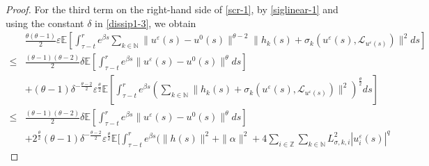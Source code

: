 \documentclass[11pt]{article}
\numberwithin{equation}{section}
\theoremstyle{plain}
\begin{document}
\begin{proof}
 For the third term on the right-hand side of \eqref{scr-1},  
 by \eqref{siglinear-1} and using the constant $\delta$ in \eqref{dissip1-3}, we obtain 
 \begin{align} \label{scr-4}      
       & \frac{\theta(\theta - 1)}{2} \varepsilon \mathbb{E}
                  \left[ \int_{\tau-t}^{r} e^{\beta s}
                              \sum_{k \in \mathbb{N} }
                                     \| u^{\varepsilon}(s) - u^0(s) \|^{\theta - 2}
                                     \| h_k(s) 
                                        + \sigma_k(u^{\varepsilon}(s), \mathcal{L}_{u^{\varepsilon}(s)}) \|^2 ds
                  \right]  \nonumber\\
 \le & \frac{(\theta - 1)(\theta - 2)}{2} \delta \mathbb{E}
                   \left[ \int_{\tau-t}^{r} e^{\beta s}
                                \| u^{\varepsilon}(s) - u^0(s) \|^\theta
                            ds
                   \right]  \nonumber\\   
      & + (\theta - 1) \delta^{-\frac{\theta - 2}{2} } \varepsilon^{\frac{\theta}{2} } 
                \mathbb{E}
                      \left[ \int_{\tau-t}^{r} e^{\beta s}
                                   \left( \sum_{k \in \mathbb{N} }
                                                         \| h_k(s) 
                                                             + \sigma_k(u^{\varepsilon}(s),   \mathcal{L}_{u^{\varepsilon}(s)}) 
                                                         \|^2 
                                         \right)^{\frac{\theta}{2} } ds
                      \right]  \nonumber\\  
 \le & \frac{(\theta - 1)(\theta - 2)}{2} \delta
               \mathbb{E}
                      \left[ \int_{\tau-t}^{r} e^{\beta s}
                                   \| u^{\varepsilon}(s) - u^0(s) \|^\theta
                               ds
                      \right]  \nonumber\\   
      & + 2^{\frac{\theta}{2} } (\theta - 1) \delta^{-\frac{\theta - 2}{2} } 
             \varepsilon^{\frac{\theta}{2} } 
                   \mathbb{E}
                         \bigg[ \int_{\tau-t}^{r} e^{\beta s}
                                      \Big( \| h(s) \|^2 + \| \alpha\|^2
                                               + 4 \sum_{i \in \mathbb{Z} }
                                                         \sum_{k \in \mathbb{N} }                                     
                                                               L_{\sigma, k,i}^2 |u^{\varepsilon}_i(s)|^q

\end{align}
\end{proof}
\end{document}
